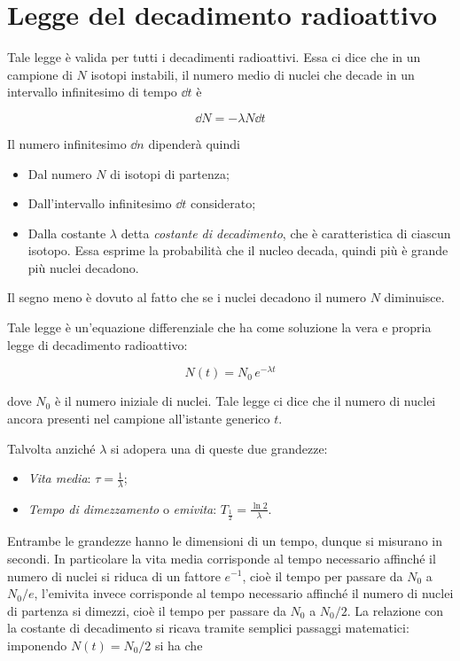 \section{Legge del decadimento radioattivo}

Tale legge è valida per tutti i decadimenti radioattivi. Essa ci dice che in un campione di $N$ isotopi instabili, il numero medio di nuclei che decade in un intervallo infinitesimo di tempo $\dd{t}$ è

\begin{equation*}
    \dd{N}=-\lambda N\dd{t}
\end{equation*}

Il numero infinitesimo $\dd{n}$ dipenderà quindi

\begin{itemize}[leftmargin=0.5cm]
    \item Dal numero $N$ di isotopi di partenza;
    \item Dall'intervallo infinitesimo $\dd{t}$ considerato;
    \item Dalla costante $\lambda$ detta \textit{costante di decadimento}, che è caratteristica di ciascun isotopo. Essa esprime la probabilità che il nucleo decada, quindi più è grande più nuclei decadono.
\end{itemize}

Il segno meno è dovuto al fatto che se i nuclei decadono il numero $N$ diminuisce.

Tale legge è un'equazione differenziale che ha come soluzione la vera e propria legge di decadimento radioattivo:

\begin{equation*}
    N(t)=N_0\,e^{-\lambda t}
\end{equation*}

dove $N_0$ è il numero iniziale di nuclei. Tale legge ci dice che il numero di nuclei ancora presenti nel campione all'istante generico $t$.

Talvolta anziché $\lambda$ si adopera una di queste due grandezze:

\begin{itemize}[leftmargin=0.5cm]
    \item \textit{Vita media}: $\displaystyle \tau=\frac{1}{\lambda}$;
    \item \textit{Tempo di dimezzamento} o \textit{emivita}: $\displaystyle T_{\frac{1}{2}}=\frac{\ln{2}}{\lambda}$.
\end{itemize}

Entrambe le grandezze hanno le dimensioni di un tempo, dunque si misurano in secondi. In particolare la vita media corrisponde al tempo necessario affinché il numero di nuclei si riduca di un fattore $e^{-1}$, cioè il tempo per passare da $N_0$ a $N_0/e$, l'emivita invece corrisponde al tempo necessario affinché il numero di nuclei di partenza si dimezzi, cioè il tempo per passare da $N_0$ a $N_0/2$. La relazione con la costante di decadimento si ricava tramite semplici passaggi matematici: imponendo $N(t)=N_0/2$ si ha che

